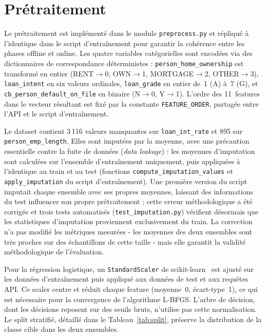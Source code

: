 \documentclass[12pt,a4paper,openany]{report}
\newcommand{\file}[1]{\texttt{#1}}
\begin{document}
\section{Prétraitement}

Le prétraitement est implémenté dans le module \file{preprocess.py} et répliqué à l'identique dans le script d'entraînement pour garantir la cohérence entre les phases offline et online. Les quatre variables catégorielles sont encodées via des dictionnaires de correspondance déterministes : \texttt{person\_home\_ownership} est transformé en entier (RENT$\to$0, OWN$\to$1, MORTGAGE$\to$2, OTHER$\to$3), \texttt{loan\_intent} en six valeurs ordinales, \texttt{loan\_grade} en entier de~1 (A) à~7 (G), et \texttt{cb\_person\_default\_on\_file} en binaire (N$\to$0, Y$\to$1). L'ordre des 11~features dans le vecteur résultant est fixé par la constante \texttt{FEATURE\_ORDER}, partagée entre l'API et le script d'entraînement.

Le dataset contient 3\,116 valeurs manquantes sur \texttt{loan\_int\_rate} et 895 sur \texttt{person\_emp\_length}. Elles sont imputées par la moyenne, avec une précaution essentielle contre la fuite de données (\emph{data leakage}) : les moyennes d'imputation sont calculées sur l'ensemble d'entraînement uniquement, puis appliquées à l'identique au train et au test (fonctions \texttt{compute\_imputation\_values} et \texttt{apply\_imputation} du script d'entraînement). Une première version du script imputait chaque ensemble avec ses propres moyennes, laissant des informations du test influencer son propre prétraitement ; cette erreur méthodologique a été corrigée et trois tests automatisés (\file{test\_imputation.py}) vérifient désormais que les statistiques d'imputation proviennent exclusivement du train. La correction n'a pas modifié les métriques mesurées - les moyennes des deux ensembles sont très proches sur des échantillons de cette taille - mais elle garantit la validité méthodologique de l'évaluation.

Pour la régression logistique, un \texttt{StandardScaler} de scikit-learn~\cite{scikit-learn} est ajusté sur les données d'entraînement puis appliqué aux données de test et aux requêtes API. Ce scaler centre et réduit chaque feature (moyenne~0, écart-type~1), ce qui est nécessaire pour la convergence de l'algorithme L-BFGS. L'arbre de décision, dont les décisions reposent sur des seuils bruts, n'utilise pas cette normalisation. Le split stratifié, détaillé dans le Tableau~\ref{tab:split}, préserve la distribution de la classe cible dans les deux ensembles.
\end{document}
